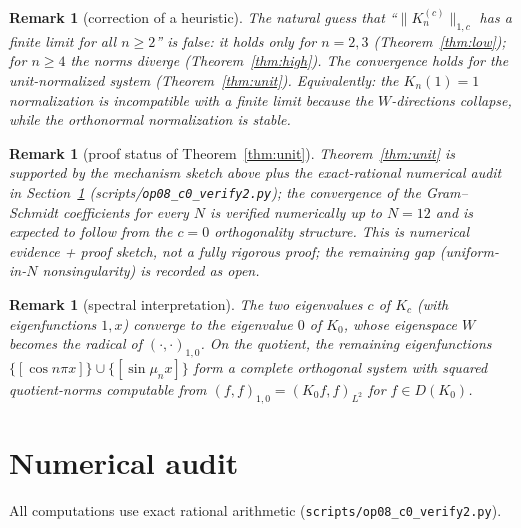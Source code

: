 ﻿\documentclass[11pt]{article}
\newtheorem{remark}[theorem]{Remark}
\begin{document}
\begin{remark}[correction of a heuristic]
	The natural guess that ``$\|K_n^{(c)}\|_{1,c}$ has a finite limit for all
	$n\ge 2$'' is \emph{false}: it holds only for $n=2,3$
	(Theorem~\ref{thm:low}); for $n\ge 4$ the norms diverge
	(Theorem~\ref{thm:high}).  The convergence holds for the unit-normalized
	system (Theorem~\ref{thm:unit}).  Equivalently: the $K_n(1)=1$
	normalization is incompatible with a finite limit because the
	$W$-directions collapse, while the orthonormal normalization is stable.
\end{remark}

\begin{remark}[proof status of Theorem~\ref{thm:unit}]
	Theorem~\ref{thm:unit} is supported by the mechanism sketch above plus
	the exact-rational numerical audit in Section~\ref{sec:audit}
	(scripts/\texttt{op08\_c0\_verify2.py}); the convergence of the
	Gram--Schmidt coefficients for \emph{every} $N$ is verified numerically
	up to $N=12$ and is expected to follow from the $c=0$ orthogonality
	structure.  This is \emph{numerical evidence + proof sketch}, not a
	fully rigorous proof; the remaining gap (uniform-in-$N$ nonsingularity)
	is recorded as open.
\end{remark}

\begin{remark}[spectral interpretation]
	The two eigenvalues $c$ of $K_c$ (with eigenfunctions $1,x$) converge to
	the eigenvalue $0$ of $K_0$, whose eigenspace $W$ becomes the radical of
	$(\cdot,\cdot)_{1,0}$.  On the quotient, the remaining eigenfunctions
	$\{[\cos n\pi x]\}\cup\{[\sin\mu_n x]\}$ form a complete orthogonal system
	with squared quotient-norms computable from
	$(f,f)_{1,0}=(K_0f,f)_{L^2}$ for $f\in D(K_0)$.
\end{remark}

\section{Numerical audit}\label{sec:audit}

All computations use exact rational arithmetic
(\texttt{scripts/op08\_c0\_verify2.py}).
\end{document}
